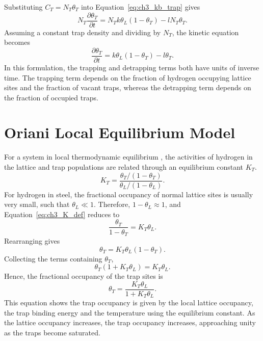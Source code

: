 \documentclass[a4paper,12pt,oneside]{report}
\begin{document}
Substituting $C_T=N_T\theta_T$ into Equation~\eqref{eq:ch3_kb_trap} gives
\begin{equation}
N_T\frac{\partial\theta_T}{\partial t} = N_Tk\theta_L(1-\theta_T)-lN_T\theta_T.
\label{eq:ch3_kb_sub}
\end{equation}
Assuming a constant trap density and dividing by $N_T$, the kinetic equation becomes
\begin{equation}
\frac{\partial\theta_T}{\partial t} = k\theta_L(1-\theta_T)-l\theta_T.
\label{eq:ch3_kb_theta}
\end{equation}
In this formulation, the trapping and detrapping terms both have units of inverse time. The trapping term depends on the fraction of hydrogen occupying lattice sites and the fraction of vacant traps, whereas the detrapping term depends on the fraction of occupied traps.

\section{Oriani Local Equilibrium Model}

For a system in local thermodynamic equilibrium \cite{Oriani1970}, the activities of hydrogen in the lattice and trap populations are related through an equilibrium constant $K_T$.
\begin{equation}
K_T = \frac{\theta_T/(1-\theta_T)}{\theta_L/(1-\theta_L)}.
\label{eq:ch3_K_def}
\end{equation}
For hydrogen in steel, the fractional occupancy of normal lattice sites is usually very small, such that $\theta_L\ll1$. Therefore, $1-\theta_L\approx1$, and Equation~\eqref{eq:ch3_K_def} reduces to
\begin{equation}
\frac{\theta_T}{1-\theta_T} = K_T\theta_L.
\label{eq:ch3_K_dilute}
\end{equation}
Rearranging gives
\begin{equation}
\theta_T = K_T\theta_L(1-\theta_T).
\label{eq:ch3_th_rearr}
\end{equation}
Collecting the terms containing $\theta_T$,
\begin{equation}
\theta_T(1+K_T\theta_L) = K_T\theta_L.
\label{eq:ch3_th_collect}
\end{equation}
Hence, the fractional occupancy of the trap sites is
\begin{equation}
\boxed{
\theta_T = \frac{K_T\theta_L}{1+K_T\theta_L}
}.
\label{eq:ch3_oriani}
\end{equation}
This equation shows the trap occupancy is given by the local lattice occupancy, the trap binding energy and the temperature using the equilibrium constant. As the lattice occupancy increases, the trap occupancy increases, approaching unity as the traps become saturated.
\end{document}
